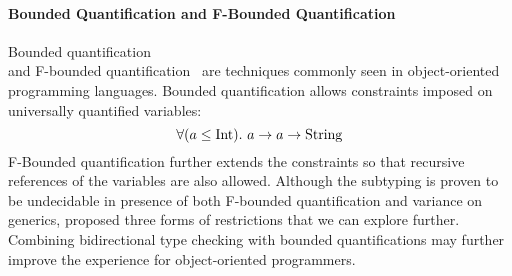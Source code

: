 \paragraph{Bounded Quantification and F-Bounded Quantification}
Bounded quantification
\\ \citep{cardelli1985bounded} and
F-bounded quantification~\citep{canning1989fbounded} are
techniques commonly seen in object-oriented programming languages.
Bounded quantification allows constraints imposed on
universally quantified variables:
$$\all[(a \le \text{Int})] a \to a \to \text{String}$$
F-Bounded quantification further extends the constraints so that
recursive references of the variables are also allowed.
Although the subtyping is proven to be undecidable
in presence of both F-bounded quantification and variance on generics,
\citet{kennedy2007on} proposed three forms of restrictions that
we can explore further.
Combining bidirectional type checking with bounded quantifications
may further improve the experience for object-oriented programmers.


